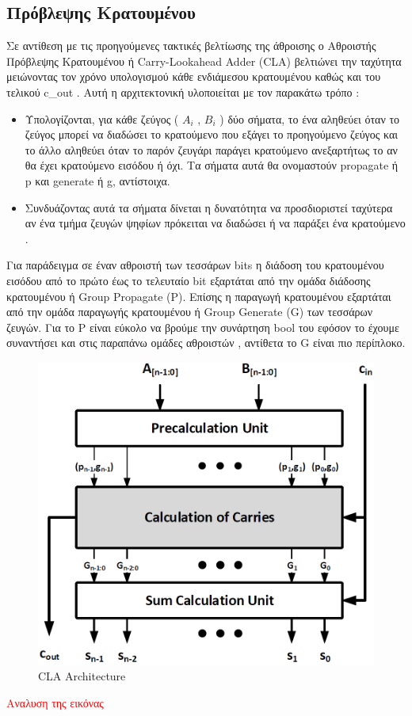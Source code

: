 \subsection{Πρόβλεψης Κρατουμένου}
Σε αντίθεση με τις προηγούμενες τακτικές βελτίωσης της άθροισης ο Αθροιστής Πρόβλεψης Κρατουμένου ή Carry-Lookahead Adder (CLA) βελτιώνει την ταχύτητα μειώνοντας τον χρόνο υπολογισμού κάθε ενδιάμεσου κρατουμένου καθώς και του τελικού c\_out .
Αυτή η αρχιτεκτονική υλοποιείται με τον παρακάτω τρόπο :
\begin{itemize}
    \item Υπολογίζονται, για κάθε ζεύγος ( $A_i$ , $B_i$ ) δύο σήματα, το ένα αληθεύει 
    όταν το ζεύγος μπορεί να διαδώσει το κρατούμενο που εξάγει το προηγούμενο ζεύγος 
    και το άλλο αληθεύει όταν το παρόν ζευγάρι παράγει κρατούμενο ανεξαρτήτως το 
    αν θα έχει κρατούμενο εισόδου ή όχι. Τα σήματα αυτά θα ονομαστούν propagate ή p
    και generate ή g, αντίστοιχα. 
    \item Συνδυάζοντας αυτά τα σήματα δίνεται η δυνατότητα να προσδιοριστεί ταχύτερα αν ένα τμήμα ζευγών ψηφίων πρόκειται να διαδώσει ή να παράξει ένα κρατούμενο .
\end{itemize}


Για παράδειγμα σε έναν αθροιστή των τεσσάρων bits η διάδοση του κρατουμένου εισόδου από το πρώτο έως το τελευταίο bit εξαρτάται από την ομάδα διάδοσης κρατουμένου ή Group Propagate (P). Επίσης η παραγωγή κρατουμένου εξαρτάται από την ομάδα παραγωγής κρατουμένου ή Group Generate (G) των τεσσάρων ζευγών. Για το P είναι εύκολο να βρούμε την συνάρτηση bool του εφόσον το έχουμε συναντήσει και στις παραπάνω ομάδες αθροιστών , αντίθετα το G είναι πιο περίπλοκο. 

\begin{figure}[H]
\centering
\includegraphics[width=\textwidth]{Pictures/CLA_Architecture.png}
\caption{CLA Architecture}
\label{cla_architecture}
\end{figure}

\textcolor{red}{Αναλυση της εικόνας}